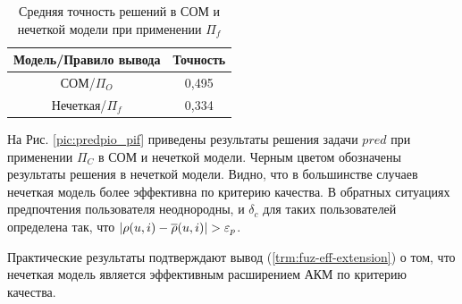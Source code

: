 \begin{table}[H]
	\caption{Средняя точность решений в СОМ и нечеткой модели при применении
	$\Pi_f$}
  \begin{center}
	\label{tbl:predfuz}
	\begin{tabular}{|c|c|}
	  \hline
		Модель/Правило вывода & Точность \\ \hline
		СОМ/$\Pi_{O}$&0,495\\ \hline
		Нечеткая/$\Pi_{f}$&0,334 \\ \hline
	\end{tabular}
  \end{center}
\end{table}


На Рис. \ref{pic:predpio_pif} приведены результаты решения
задачи $pred$ при применении $\Pi_C$ в СОМ и нечеткой модели.
Черным цветом обозначены результаты решения в нечеткой модели.
Видно, что в большинстве случаев нечеткая модель более эффективна
по критерию качества. В обратных ситуациях предпочтения пользователя
неоднородны, и $\delta_c$ для таких пользователей определена так, что
$|\rho(u, i) - \overline{\rho}(u, i)| > \varepsilon_p$.

Практические результаты подтверждают вывод (\ref{trm:fuz-eff-extension}) о том,
что нечеткая модель является эффективным расширением АКМ по критерию качества.

